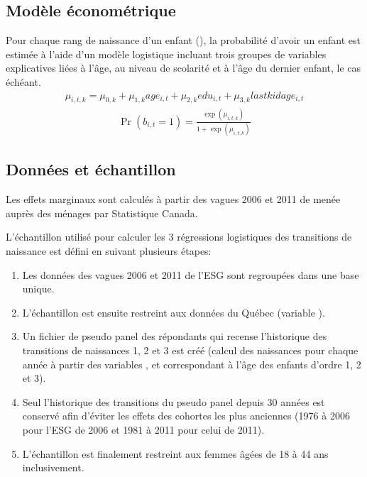 \documentclass[letterpaper,10pt,french]{sphinxmanual}
\begin{document}
\subsection{Modèle économétrique}
\label{\detokenize{methodologie:modele-econometrique}}
Pour chaque rang de naissance d’un enfant (), la probabilité d’avoir un enfant est estimée à l’aide d’un modèle logistique
incluant trois groupes de variables explicatives liées à l’âge, au niveau de scolarité et à l’âge du dernier enfant, le cas échéant.
\begin{equation*}
\begin{split}\mu_{i,t,k} = \mu_{0,k} + \mu_{1,k} age_{i,t} + \mu_{2,k} edu_{i,t} + \mu_{3,k} lastkidage_{i,t}\end{split}
\end{equation*}\begin{equation*}
\begin{split}\Pr(b_{i,t}=1) = \frac{\exp(\mu_{i,t,k})}{1+\exp(\mu_{i,t,k})}\end{split}
\end{equation*}

\subsection{Données et échantillon}
\label{\detokenize{methodologie:donnees-et-echantillon}}
Les effets marginaux sont calculés à partir des vagues 2006 et 2011 de
 menée auprès des ménages
par Statistique Canada.

L’échantillon utilisé pour calculer les 3 régressions logistiques des transitions de naissance est défini en suivant plusieurs étapes:
\begin{enumerate}
%
\item {} 
Les données des vagues 2006 et 2011 de l’ESG sont regroupées dans une base unique.

\item {} 
L’échantillon est ensuite restreint aux données du Québec (variable ).

\item {} 
Un fichier de pseudo panel des répondants qui recense l’historique des transitions de naissances 1, 2 et 3 est créé (calcul des naissances pour chaque année à partir des variables ,  et  correspondant à l’âge des enfants d’ordre 1, 2 et 3).

\item {} 
Seul l’historique des transitions du pseudo panel depuis 30 années est conservé afin d’éviter les effets des cohortes les plus anciennes
(1976 à 2006 pour l’ESG de 2006 et 1981 à 2011 pour celui de 2011).

\item {} 
L’échantillon est finalement restreint aux femmes âgées de 18 à 44 ans inclusivement.

\end{enumerate}
\end{document}
